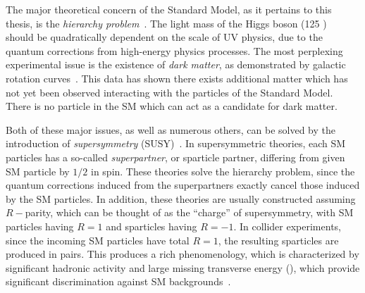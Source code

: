 The major theoretical concern of the Standard Model, as it pertains to this thesis, is the \textit{hierarchy problem}~\cite {Weinberg:1975gm,Weinberg:1979bn, Gildener:1976ai, Susskind:1978ms, susyPrimer}.
The light mass of the Higgs boson (125 \GeV)~\cite{HIGG-2012-27, CMS-HIG-12-028} should be quadratically dependent on the scale of UV physics, due to the quantum corrections from high-energy physics processes.
The most perplexing experimental issue is the existence of \textit{dark matter}, as demonstrated by galactic rotation curves~\cite{Rubin:1970zza, Roberts:1970zza, Rubin:1980zd, Rubin:1985ze, Bosma:1981zz, Persic:1995ru, darkMatterPrimer}.
This data has shown there exists additional matter which has not yet been observed interacting with the particles of the Standard Model.
There is no particle in the SM which can act as a candidate for dark matter.

Both of these major issues, as well as numerous others, can be solved by the introduction of \textit{supersymmetry} (SUSY)~\cite{Miyazawa:1966mfa, Gervais:1971xj, Gervais:1971ji, Golfand:1971iw, Neveu:1971rx, Neveu:1971iv, Volkov:1973ix,  Wess:1973kz, Salam:1974ig, Ferrara:1974ac, Wess:1974tw, susyPrimer,Lykken:1996xt,archilSUSYLectures}.
In supersymmetric theories, each SM particles has a so-called \textit{superpartner}, or sparticle partner, differing from given SM particle by $1/2$ in spin.
These theories solve the hierarchy problem, since the quantum corrections induced from the superpartners exactly cancel those induced by the SM particles.
In addition, these theories are usually constructed assuming $R-$parity, which can be thought of as the ``charge'' of supersymmetry, with SM particles having $R=1$ and sparticles having $R=-1$.
In collider experiments, since the incoming SM particles have total $R=1$, the resulting sparticles are produced in pairs.
This produces a rich phenomenology, which is characterized by significant hadronic activity and large missing transverse energy (\met), which provide significant discrimination against SM backgrounds~\cite{Farrar:1978xj}.

